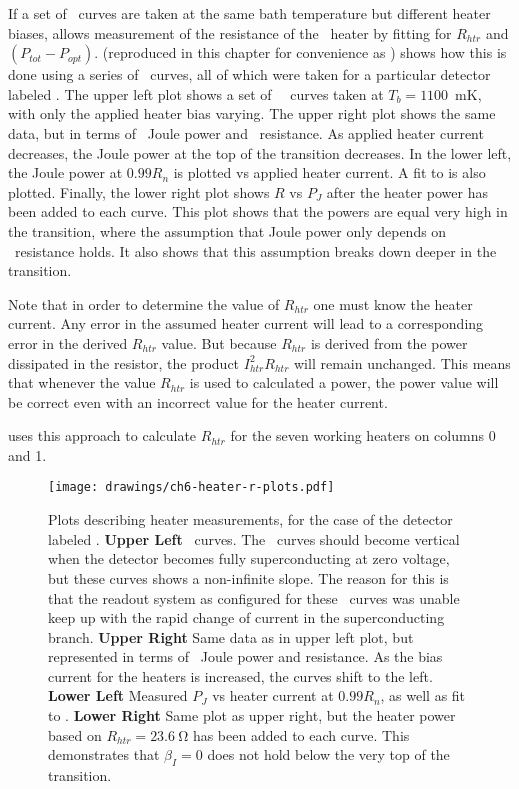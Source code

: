 If a set of \IV\ curves are taken at the same bath temperature but different heater biases,  allows measurement of the resistance of the \TES\ heater by fitting for $R_{htr}$ and $(P_{tot} - P_{opt})$.
 (reproduced in this chapter for convenience as ) shows how this is done using a series of \IV\ curves, all of which were taken for a particular detector labeled .
The upper left plot shows a set of \TES\ \IV\ curves taken at $T_b = 1100$~mK, with only the applied heater bias varying.
The upper right plot shows the same data, but in terms of \TES\ Joule power and \TES\ resistance.
As applied heater current decreases, the Joule power at the top of the transition decreases.
In the lower left, the Joule power at $0.99R_{n}$ is plotted vs applied heater current.
A fit to  is also plotted.
Finally, the lower right plot shows $R$ vs $P_J$ after the heater power has been added to each curve.
This plot shows that the powers are equal very high in the transition, where the assumption that Joule power only depends on \TES\ resistance holds.
It also shows that this assumption breaks down deeper in the transition.

Note that in order to determine the value of $R_{htr}$ one must know the heater current.
Any error in the assumed heater current will lead to a corresponding error in the derived $R_{htr}$ value.
But because $R_{htr}$ is derived from the power dissipated in the resistor, the product $I_{htr}^2 R_{htr}$ will remain unchanged.
This means that whenever the value $R_{htr}$ is used to calculated a power, the power value will be correct even with an incorrect value for the heater current.

 uses this approach to calculate $R_{htr}$ for the seven working heaters on columns 0 and 1.

\begin{figure*}
\texttt{[image: drawings/ch6-heater-r-plots.pdf]}
\caption[Plots describing heater measurements]{
Plots describing heater measurements, for the case of the detector labeled .
\textbf{Upper Left} \IV\ curves. The \IV\ curves should become vertical when the detector becomes fully superconducting at zero voltage, but these curves shows a non-infinite slope. The reason for this is that the readout system as configured for these \IV\ curves was unable keep up with the rapid change of current in the superconducting branch.
\textbf{Upper Right} Same data as in upper left plot, but represented in terms of \TES\ Joule power and resistance. As the bias current for the heaters is increased, the curves shift to the left.
\textbf{Lower Left} Measured $P_{J}$ vs heater current at $0.99R_n$, as well as fit to .
\textbf{Lower Right} Same plot as upper right, but the heater power based on $R_{htr} = \SI{23.6}{\ohm}$ has been added to each curve.
This demonstrates that $\beta_I = 0$ does not hold below the very top of the transition.}
\label{fig:ch3-heater-r-plots}
\end{figure*}

